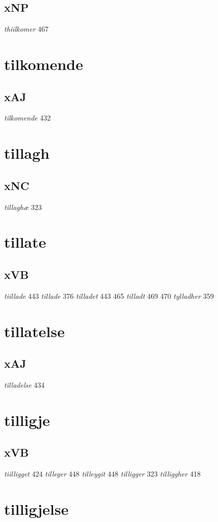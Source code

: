 \documentclass[a4paper,twocolumn]{article}
\begin{document}
\subsection{xNP}
\label{sec:orgc46ad6c}
\emph{thiilkomer} 467 
\section{tilkomende}
\label{sec:orgd31c807}
\subsection{xAJ}
\label{sec:org7b760fb}
\emph{tilkomende} 432 
\section{tillagh}
\label{sec:org494a61a}
\subsection{xNC}
\label{sec:org36dc4dd}
\emph{tillaghæ} 323 
\section{tillate}
\label{sec:orgd6946c8}
\subsection{xVB}
\label{sec:org3e7f2b1}
\emph{tiillade} 443 \emph{tillade} 376 \emph{tilladet} 443 465 \emph{tilladt} 469 470 \emph{tylladher} 359 
\section{tillatelse}
\label{sec:orgc58fb26}
\subsection{xAJ}
\label{sec:org8d549d1}
\emph{tilladelse} 434 
\section{tilligje}
\label{sec:orgf78849c}
\subsection{xVB}
\label{sec:org4fdb343}
\emph{tiilligget} 424 \emph{tilleger} 448 \emph{tilleygit} 448 \emph{tilligger} 323 \emph{tilliggher} 418 
\section{tilligjelse}
\label{sec:orga1f82d9}
\end{document}
